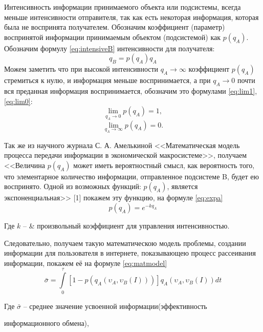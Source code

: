 Интенсивность информации принимаемого объекта или подсистемы, всегда меньше интенсивности отправителя, так как есть некоторая информация, которая была не воспринята получателем. Обозначим коэффициент (параметр) воспринятой информации принимаемым объектом (подсистемой) как $p(q_A)$. Обозначим формулу \ref{eq:intensiveB} интенсивности для получателя:
\begin{equation}\label{eq:intensiveB}
q_B = p(q_A)q_A
\end{equation}
Можем заметить что при высокой интенсивности $q_A \rightarrow \infty$ коэффициент $p(q_A)$ стремиться к нулю, и информация меньше воспринимается, а при $q_A \rightarrow 0$ почти вся преданная информация воспринимается, обозначим это формулами \ref{eq:lim1}, \ref{eq:lim0}:
\begin{equation}\label{eq:lim1}
\lim_{q_A \rightarrow 0} p(q_A) = 1,
\end{equation}
\begin{equation}\label{eq:lim0}
\lim_{q_A \rightarrow \infty} p(q_A) = 0.
\end{equation}

Так же из научного журнала С. А. Амелькиной <<Математическая модель процесса передачи информации в экономической макросистеме>>, получаем <<Величина $p(q_A)$ может иметь вероятностный смысл, как вероятность того, что элементарное количество информации, отправленное
подсистеме B, будет ею воспринято. Одной из возможных функций:
$p(q_A)$, является экспоненциальная>> [1] покажем эту функцию, на формуле \ref{eq:expa}
\begin{equation}\label{eq:expa}
p(q_A) = e^{ - k q_A }
\end{equation}

Где $k$ -- & произвольный коэффициент для управления интенсивностью.

Следовательно, получаем такую математическою модель проблемы, создании информации для пользователя в интернете, показывающею процесс рассеивания информации, покажем её на формуле \ref{eq:matmodel}
\begin{equation}\label{eq:matmodel}
\bar \sigma  = \int\limits_0^\tau  {\left[ {1 - p\left( {q_A \left( {\upsilon _A ,\upsilon _B \left( I \right)} \right)} \right)} \right]} q_A \left( {\upsilon _A ,\upsilon _B \left( I \right)} \right)dt
\end{equation}

Где $\bar \sigma$ -- среднее значение усвоенной информации(эффективность

информационного обмена),

